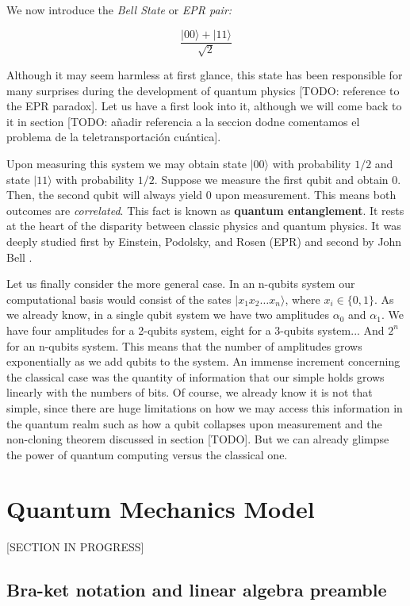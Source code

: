 We now introduce the \emph{Bell State} or \emph{EPR pair:}

$$ \frac{ |00\rangle + |11\rangle }{ \sqrt 2 } $$

Although it may seem harmless at first glance, this state has been responsible for many surprises during the development of quantum physics [TODO: reference to the EPR paradox]. Let us have a first look into it, although we will come back to it in section [TODO: añadir referencia a la seccion dodne comentamos el problema de la teletransportación cuántica].

Upon measuring this system we may obtain state $|00\rangle$ with probability $1/2$ and state $|11\rangle$ with probability $1/2$. Suppose we measure the first qubit and obtain $0$. Then, the second qubit will always yield $0$ upon measurement. This means both outcomes are \emph{correlated}. This fact is known as \textbf{quantum entanglement}. It rests at the heart of the disparity between classic physics and quantum physics. It was deeply studied first by Einstein, Podolsky, and Rosen (EPR) \cite{Einstein1935} and second by John Bell \cite{Bellt1964}.

Let us finally consider the more general case. In an n-qubits system our computational basis would consist of the sates $|x_1 x_2 \dotsc x_n\rangle$, where $x_i \in \{0,1\}$. As we already know, in a single qubit system we have two amplitudes $\alpha_0$ and $\alpha_1$. We have four amplitudes for a 2-qubits system, eight for a 3-qubits system... And $2^n$ for an n-qubits system. This means that the number of amplitudes grows exponentially as we add qubits to the system. An immense increment concerning the classical case was the quantity of information that our simple holds grows linearly with the numbers of bits. Of course, we already know it is not that simple, since there are huge limitations on how we may access this information in the quantum realm such as how a qubit collapses upon measurement and the non-cloning theorem discussed in section [TODO]. But we can already glimpse the power of quantum computing versus the classical one.

\section{Quantum Mechanics Model}

[SECTION IN PROGRESS]

\subsection{Bra-ket notation and linear algebra preamble}

